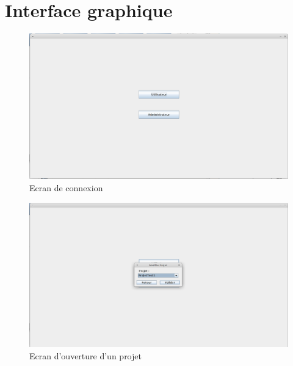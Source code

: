 \documentclass[12pt]{report}
\begin{document}
\section{Interface graphique}

\begin{figure}
\centering
\includegraphics[scale=0.3]{IHM/accueil.png}
\caption{Ecran de connexion}
\end{figure}

\begin{figure}
\centering
\includegraphics[scale=0.3]{IHM/selection_modifier_projet.png}
\caption{Ecran d'ouverture d'un projet}
\end{figure}
\end{document}
